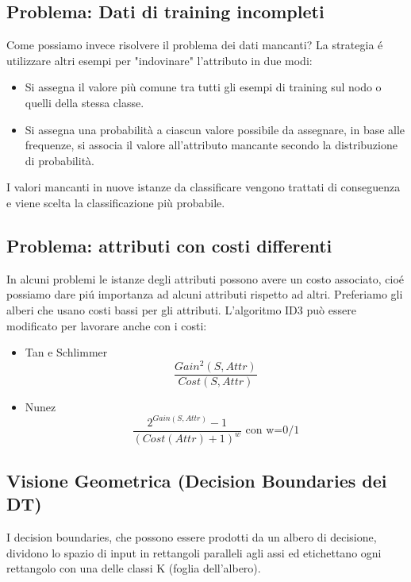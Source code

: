 \documentclass{article}
\begin{document}
\subsection{Problema: Dati di training incompleti}
Come possiamo invece risolvere il problema dei dati mancanti? La strategia é utilizzare altri esempi per "indovinare" l'attributo in due modi:
\begin{itemize}
    \item Si assegna il valore più comune tra tutti gli esempi di training sul nodo o quelli della stessa classe.
    \item Si assegna una probabilità a ciascun valore possibile da assegnare, in base alle frequenze, si associa il valore all'attributo mancante secondo la distribuzione di probabilità.
\end{itemize}
I valori mancanti in nuove istanze da classificare vengono trattati di conseguenza e viene scelta la classificazione più probabile.

\subsection{Problema: attributi con costi differenti}
In alcuni problemi le istanze degli attributi possono avere un costo associato, cioé possiamo dare piú importanza ad alcuni attributi rispetto ad altri. Preferiamo gli alberi che usano costi bassi per gli attributi. L'algoritmo ID3 può essere modificato per lavorare anche con i costi:
\begin{itemize}
    \item Tan e Schlimmer 
        \begin{equation}
            \frac{Gain^2(S,Attr)}{Cost(S,Attr)}
        \end{equation}
    \item Nunez
        \begin{equation}
            \frac{2^{Gain(S,Attr)}-1}{(Cost(Attr)+1)^w} \text{ con w=0/1}
        \end{equation}
\end{itemize}
\clearpage

\subsection{Visione Geometrica (Decision Boundaries dei DT)}
I decision boundaries, che possono essere prodotti da un albero di decisione, dividono lo spazio di input in rettangoli paralleli agli assi ed etichettano ogni rettangolo con una delle classi K (foglia dell'albero).
\end{document}
